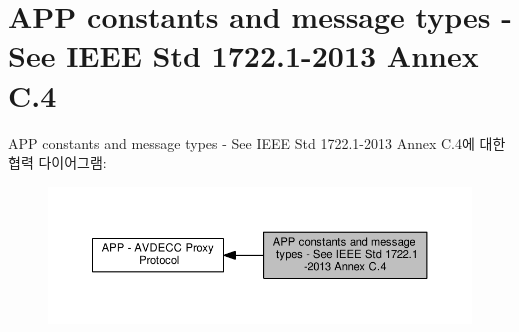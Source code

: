 \hypertarget{group__appdu__constants}{}\section{A\+PP constants and message types -\/ See I\+E\+EE Std 1722.1-\/2013 Annex C.4}
\label{group__appdu__constants}
A\+PP constants and message types -\/ See I\+E\+EE Std 1722.1-\/2013 Annex C.4에 대한 협력 다이어그램\+:
\nopagebreak
\begin{figure}[H]
\begin{center}
\leavevmode
\includegraphics[width=350pt]{group__appdu__constants}
\end{center}
\end{figure}
